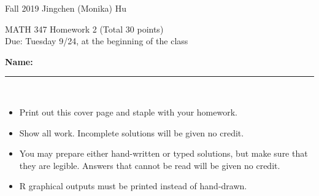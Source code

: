 \documentclass[11pt]{article}
\begin{document}
\enlargethispage{\baselineskip}

Fall 2019 \hfill Jingchen (Monika) Hu\\

\begin{center}
{\huge MATH 347 Homework 2 (Total 30 points)}	\\
Due: Tuesday 9/24, at the beginning of the class
\end{center}
\vspace{0.5cm}

\textbf{Name:} \rule{6cm}{0.5pt}\\


{\bf
\begin{itemize}
\item Print out this cover page and staple with your homework.
\item Show all work. Incomplete solutions will be given no credit.
\item You may prepare either hand-written or typed solutions,
but make sure that they are legible.
Answers that cannot be read will be given no credit.
\item R graphical outputs must be printed instead of hand-drawn.

\end{itemize}
}
\end{document}
